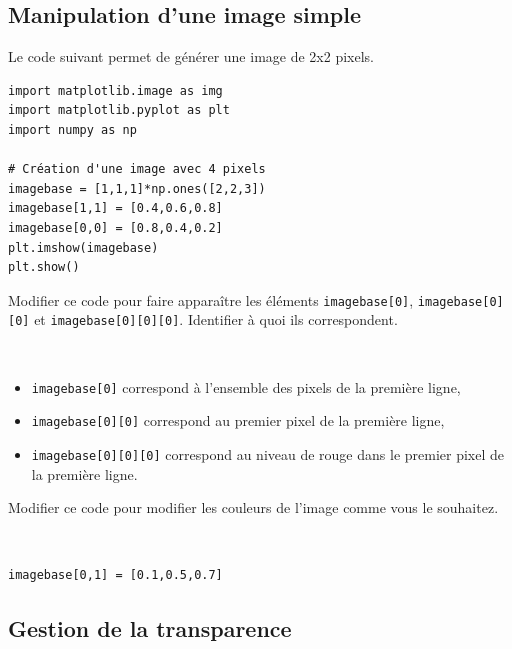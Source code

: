 \subsection{Manipulation d'une image simple}

Le code suivant permet de générer une image de 2x2 pixels.

\begin{verbatim}
import matplotlib.image as img
import matplotlib.pyplot as plt
import numpy as np

# Création d'une image avec 4 pixels
imagebase = [1,1,1]*np.ones([2,2,3])
imagebase[1,1] = [0.4,0.6,0.8]
imagebase[0,0] = [0.8,0.4,0.2]
plt.imshow(imagebase)
plt.show()
\end{verbatim}   

\begin{exercice}
Modifier ce code pour faire apparaître les éléments \verb?imagebase[0]?, \verb?imagebase[0][0]? et \verb?imagebase[0][0][0]?. Identifier à quoi ils correspondent.
\end{exercice}

\begin{solution}~\ 
\begin{itemize}
 \item \verb?imagebase[0]? correspond à l'ensemble des pixels de la première ligne,
 \item \verb?imagebase[0][0]? correspond au premier pixel de la première ligne,
 \item \verb?imagebase[0][0][0]? correspond au niveau de rouge dans le premier pixel de la première ligne.
\end{itemize}
\end{solution}

\begin{exercice}
Modifier ce code pour modifier les couleurs de l'image comme vous le souhaitez.
\end{exercice}

\begin{solution}~\\
\vspace{-0.7cm}
\begin{verbatim}
imagebase[0,1] = [0.1,0.5,0.7]
\end{verbatim} 
\end{solution}

\subsection{Gestion de la transparence}

